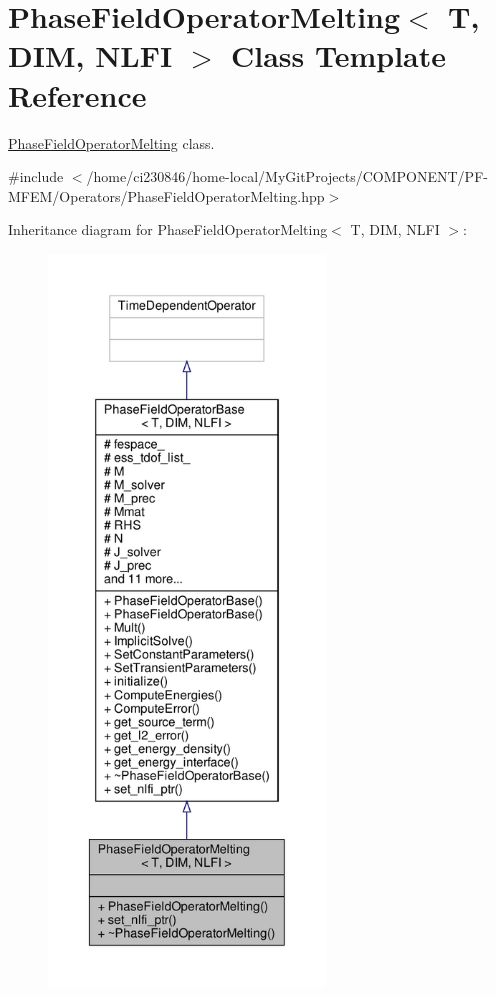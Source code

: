 \hypertarget{classPhaseFieldOperatorMelting}{}\section{Phase\+Field\+Operator\+Melting$<$ T, D\+IM, N\+L\+FI $>$ Class Template Reference}
\label{classPhaseFieldOperatorMelting}


\hyperlink{classPhaseFieldOperatorMelting}{Phase\+Field\+Operator\+Melting} class.  




{\ttfamily \#include $<$/home/ci230846/home-\/local/\+My\+Git\+Projects/\+C\+O\+M\+P\+O\+N\+E\+N\+T/\+P\+F-\/\+M\+F\+E\+M/\+Operators/\+Phase\+Field\+Operator\+Melting.\+hpp$>$}



Inheritance diagram for Phase\+Field\+Operator\+Melting$<$ T, D\+IM, N\+L\+FI $>$\+:\nopagebreak
\begin{figure}[H]
\begin{center}
\leavevmode
\includegraphics[height=550pt]{classPhaseFieldOperatorMelting__inherit__graph}
\end{center}
\end{figure}



